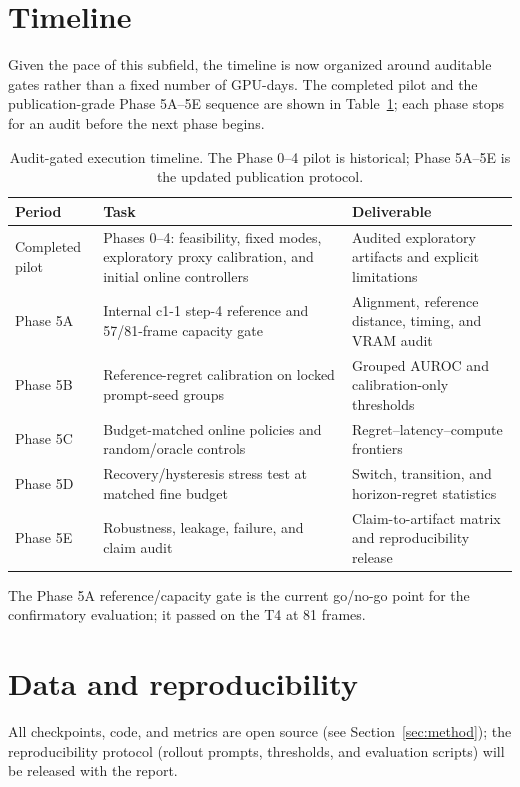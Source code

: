 \documentclass[11pt,a4paper]{article}
\begin{document}
\section{Timeline}\label{sec:timeline}

Given the pace of this subfield, the timeline is now organized around auditable gates rather than a fixed number of GPU-days. The completed pilot and the publication-grade Phase 5A--5E sequence are shown in Table~\ref{tab:timeline}; each phase stops for an audit before the next phase begins.

\begin{table}[ht]
\centering
\small
\renewcommand{\arraystretch}{1.3}
\begin{tabularx}{\textwidth}{>{\raggedright\arraybackslash}p{2.6cm} >{\raggedright\arraybackslash}X >{\raggedright\arraybackslash}X}
\toprule
\textbf{Period} & \textbf{Task} & \textbf{Deliverable} \\
\midrule
Completed pilot & Phases 0--4: feasibility, fixed modes, exploratory proxy calibration, and initial online controllers & Audited exploratory artifacts and explicit limitations \\
Phase 5A & Internal c1-1 step-4 reference and 57/81-frame capacity gate & Alignment, reference distance, timing, and VRAM audit \\
Phase 5B & Reference-regret calibration on locked prompt-seed groups & Grouped AUROC and calibration-only thresholds \\
Phase 5C & Budget-matched online policies and random/oracle controls & Regret--latency--compute frontiers \\
Phase 5D & Recovery/hysteresis stress test at matched fine budget & Switch, transition, and horizon-regret statistics \\
Phase 5E & Robustness, leakage, failure, and claim audit & Claim-to-artifact matrix and reproducibility release \\
\bottomrule
\end{tabularx}
\caption{Audit-gated execution timeline. The Phase 0--4 pilot is historical; Phase 5A--5E is the updated publication protocol.}
\label{tab:timeline}
\end{table}
\FloatBarrier

The Phase 5A reference/capacity gate is the current go/no-go point for the confirmatory evaluation; it passed on the T4 at 81 frames.

\section*{Data and reproducibility}
All checkpoints, code, and metrics are open source (see Section~\ref{sec:method}); the reproducibility protocol (rollout prompts, thresholds, and evaluation scripts) will be released with the report.

\FloatBarrier
\printbibliography[heading=bibintoc, title={References}]
\end{document}
